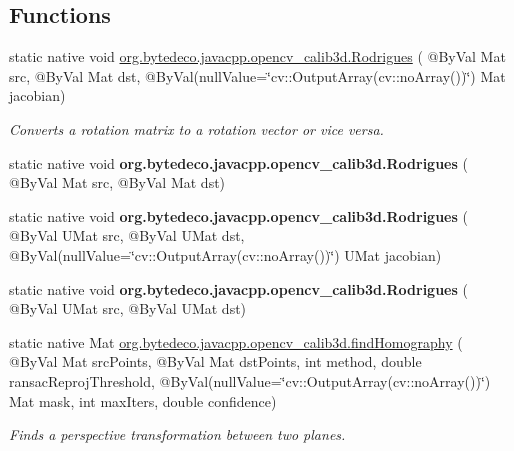 \subsection*{Functions}
\begin{DoxyCompactItemize}
\item 
static native void \hyperlink{group__calib3d_ga20092873ec8f2850a2df8acb2648de68}{org.\+bytedeco.\+javacpp.\+opencv\+\_\+calib3d.\+Rodrigues} ( @By\+Val Mat src, @By\+Val Mat dst, @By\+Val(null\+Value=\char`\"{}cv\+::\+Output\+Array(cv\+::no\+Array())\char`\"{}) Mat jacobian)
\begin{DoxyCompactList}\small\item\em Converts a rotation matrix to a rotation vector or vice versa. \end{DoxyCompactList}\item 
\mbox{\label{group__calib3d_ga23ec1f7e432b7503dc359eb0e73a11e2}} 
static native void {\bfseries org.\+bytedeco.\+javacpp.\+opencv\+\_\+calib3d.\+Rodrigues} ( @By\+Val Mat src, @By\+Val Mat dst)
\item 
\mbox{\label{group__calib3d_ga9e623e67e1f631e396b4caf4cb84308d}} 
static native void {\bfseries org.\+bytedeco.\+javacpp.\+opencv\+\_\+calib3d.\+Rodrigues} ( @By\+Val U\+Mat src, @By\+Val U\+Mat dst, @By\+Val(null\+Value=\char`\"{}cv\+::\+Output\+Array(cv\+::no\+Array())\char`\"{}) U\+Mat jacobian)
\item 
\mbox{\label{group__calib3d_gae4628cf5855f5a65f99253c0f275096b}} 
static native void {\bfseries org.\+bytedeco.\+javacpp.\+opencv\+\_\+calib3d.\+Rodrigues} ( @By\+Val U\+Mat src, @By\+Val U\+Mat dst)
\item 
static native Mat \hyperlink{group__calib3d_ga2e20e41b600c13c08d376e5df367f480}{org.\+bytedeco.\+javacpp.\+opencv\+\_\+calib3d.\+find\+Homography} ( @By\+Val Mat src\+Points, @By\+Val Mat dst\+Points, int method, double ransac\+Reproj\+Threshold, @By\+Val(null\+Value=\char`\"{}cv\+::\+Output\+Array(cv\+::no\+Array())\char`\"{}) Mat mask, int max\+Iters, double confidence)
\begin{DoxyCompactList}\small\item\em Finds a perspective transformation between two planes. \end{DoxyCompactList}\item 
\mbox{\label{group__calib3d_gac745248bd759865415651392d0d47a80}} 

\end{DoxyCompactItemize}
